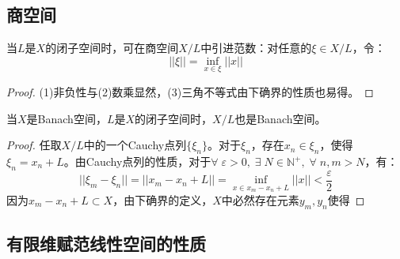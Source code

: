 \subsection{商空间}
\begin{definition}
	当$L$是$X$的闭子空间时，可在商空间$X/L$中引进范数：对任意的$\xi\in X/L$，令：
	\begin{equation*}
		||\xi||=\inf_{x\in\xi}||x||
	\end{equation*}
\end{definition}
\begin{proof}
	(1)非负性与(2)数乘显然，(3)三角不等式由下确界的性质也易得。
\end{proof}
\begin{theorem}
	当$X$是Banach空间，$L$是$X$的闭子空间时，$X/L$也是Banach空间。
\end{theorem}
\begin{proof}
	任取$X/L$中的一个Cauchy点列$\{\xi_n\}$。对于$\xi_n$，存在$x_n\in \xi_n$，使得$\xi_n=x_n+L$。由Cauchy点列的性质，对于$\forall\;\varepsilon>0,\;\exists\;N\in\mathbb{N}^+,\;\forall\;n,m>N$，有：
	\begin{equation*}
		||\xi_m-\xi_n||=||x_m-x_n+L||=\inf_{x\in x_m-x_n+L}||x||<\frac{\varepsilon}{2}
	\end{equation*}
	因为$x_m-x_n+L\subset X$，由下确界的定义，$X$中必然存在元素$y_m,y_n$使得
\end{proof}


\subsection{有限维赋范线性空间的性质}
